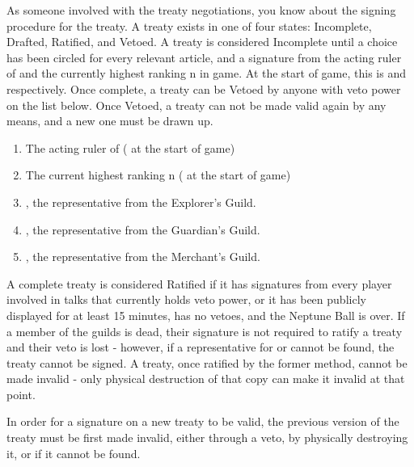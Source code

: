\documentclass[green]{NeptuneBall}
\begin{document}
\name{\gTreaty{}}

As someone involved with the treaty negotiations, you know about the signing procedure for the treaty. A treaty exists in one of four states: Incomplete, Drafted, Ratified, and Vetoed. A treaty is considered Incomplete until a choice has been circled for every relevant article, and a signature from the acting ruler of \pAtlantis{} and the currently highest ranking \pPacifica{}n in game. At the start of game, this is \cKing{\King} \cKing{} and \cPrince{\Prince} \cPrince{} respectively. Once complete, a treaty can be Vetoed by anyone with veto power on the list below. Once Vetoed, a treaty can not be made valid again by any means, and a new one must be drawn up. 

\begin{enumerate}
\item The acting ruler of \pAtlantis{} (\cKing{\King} \cKing{} at the start of game)
\item The current highest ranking \pPacifica{}n (\cPrince{\Prince} \cPrince{} at the start of game)
\item \cPriest{}, the representative from the Explorer's Guild.
\item \cGeneral{}, the representative from the Guardian's Guild.
\item \cSlave{}, the representative from the Merchant's Guild.
\end{enumerate}

A complete treaty is considered Ratified if it has signatures from every player involved in talks that currently holds veto power, or it has been publicly displayed for at least 15 minutes, has no vetoes, and the Neptune Ball is over. If a member of the guilds is dead, their signature is not required to ratify a treaty and their veto is lost - however, if a representative for \pAtlantis{} or \pPacifica{} cannot be found, the treaty cannot be signed. A treaty, once ratified by the former method, cannot be made invalid - only physical destruction of that copy can make it invalid at that point.

In order for a signature on a new treaty to be valid, the previous version of the treaty must be first made invalid, either through a veto, by physically destroying it, or if it cannot be found.
\end{document}

